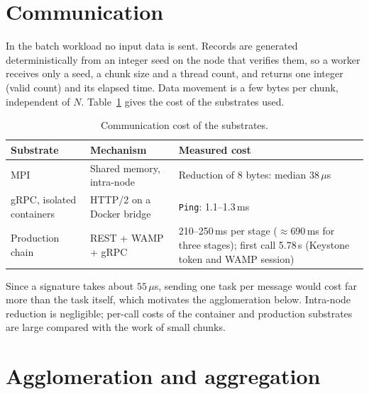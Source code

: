 \documentclass[10pt,a4paper]{article}
\begin{document}
\section{Communication}\label{sec:communication}

In the batch workload no input data is sent. Records are generated deterministically from an integer seed on the node that verifies them, so a worker receives only a seed, a chunk size and a thread count, and returns one integer (valid count) and its elapsed time. Data movement is a few bytes per chunk, independent of $N$. Table~\ref{tab:comm} gives the cost of the substrates used.

\begin{table}[t]
\centering\small
\begin{tabular}{p{3.2cm}p{4.0cm}p{6.8cm}}
\toprule
\textbf{Substrate} & \textbf{Mechanism} & \textbf{Measured cost} \\
\midrule
MPI & Shared memory, intra-node & Reduction of 8 bytes: median 38\,$\mu$s \\
gRPC, isolated containers & HTTP/2 on a Docker bridge & \texttt{Ping}: 1.1--1.3\,ms \\
Production chain & REST + WAMP + gRPC & 210--250\,ms per stage ($\approx$690\,ms for three stages); first call 5.78\,s (Keystone token and WAMP session) \\
\bottomrule
\end{tabular}
\caption{Communication cost of the substrates.}
\label{tab:comm}
\end{table}

Since a signature takes about $55\,\mu$s, sending one task per message would cost far more than the task itself, which motivates the agglomeration below. Intra-node reduction is negligible; per-call costs of the container and production substrates are large compared with the work of small chunks.

\section{Agglomeration and aggregation}\label{sec:agglomeration}
\end{document}
